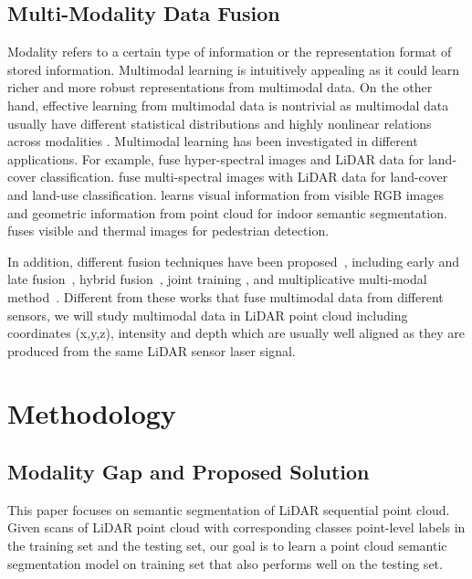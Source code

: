 \documentclass[preprint,review,3p]{elsarticle}
\begin{document}
\subsection{Multi-Modality Data Fusion}
Modality refers to a certain type of information or the representation format of stored information. Multimodal learning is intuitively appealing as it could learn richer and more robust representations from multimodal data.
On the other hand, effective learning from multimodal data is nontrivial as multimodal data usually have different statistical distributions and highly nonlinear relations across modalities \cite{liu2018learn}.
Multimodal learning has been investigated in different applications. For example, \cite{liao2014generalized,ghamisi2015land,rasti2017hyperspectral,rasti2017fusion,hong2020more} fuse hyper-spectral images and LiDAR data for land-cover classification. \cite{dechesne2017semantic,sun2018developing,hong2020more} fuse multi-spectral images with LiDAR data for land-cover and land-use classification. \cite{qi20173d} learns visual information from visible RGB images and geometric information from point cloud for indoor semantic segmentation. \cite{guan2019fusion,cao2019box} fuses visible and thermal images for pedestrian detection.

In addition, different fusion techniques have been proposed~\cite{atrey2010multimodal,liu2018learn}, including early and late fusion~\cite{snoek2005early,gunes2005affect}, hybrid fusion~\cite{bendjebbour2001multisensor,xu2006fusion}, joint training \cite{ngiam2011multimodal,sun2019not}, and multiplicative multi-modal method~\cite{liu2018learn}. Different from these works that fuse multimodal data from different sensors, we will study multimodal data in LiDAR point cloud including coordinates (x,y,z), intensity and depth which are usually well aligned as they are produced from the same LiDAR sensor laser signal.

\section{Methodology}\label{Sec.methodology}

\subsection{Modality Gap and Proposed Solution}\label{Sec.problem_definition}
This paper focuses on semantic segmentation of LiDAR sequential point cloud. 
Given scans of LiDAR  point cloud with corresponding  classes point-level labels in the training set and the testing set, our goal is to learn a point cloud semantic segmentation model  on training set that also performs well on the testing set. 
\end{document}
